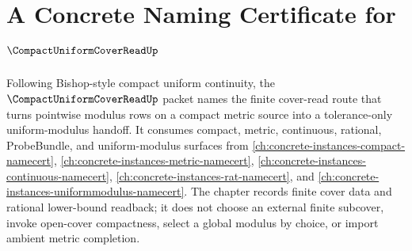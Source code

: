 \chapter{A Concrete Naming Certificate for $\CompactUniformCoverReadUp$}
\label{ch:concrete-instances-compact-uniform-cover-read-namecert}

Following Bishop-style compact uniform continuity, the $\CompactUniformCoverReadUp$ packet names the finite cover-read route that turns pointwise modulus rows on a compact metric source into a tolerance-only uniform-modulus handoff. It consumes compact, metric, continuous, rational, ProbeBundle, and uniform-modulus surfaces from \autoref{ch:concrete-instances-compact-namecert}, \autoref{ch:concrete-instances-metric-namecert}, \autoref{ch:concrete-instances-continuous-namecert}, \autoref{ch:concrete-instances-rat-namecert}, and \autoref{ch:concrete-instances-uniformmodulus-namecert}. The chapter records finite cover data and rational lower-bound readback; it does not choose an external finite subcover, invoke open-cover compactness, select a global modulus by choice, or import ambient metric completion.

